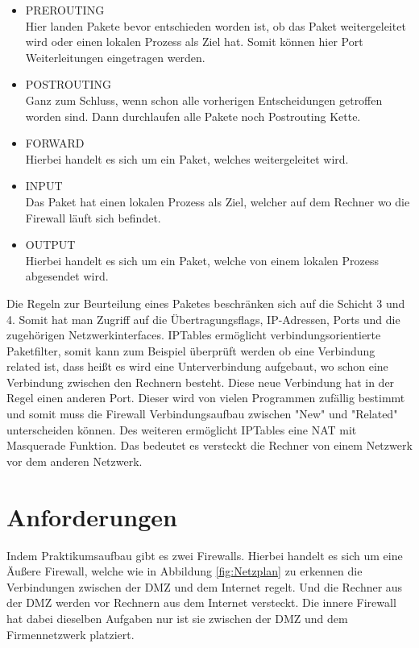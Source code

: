 \begin{itemize}
	\item PREROUTING \\
	Hier landen Pakete bevor entschieden worden ist, ob das Paket weitergeleitet wird oder einen lokalen Prozess als Ziel hat. Somit können hier Port Weiterleitungen eingetragen werden.
	\item POSTROUTING \\
	Ganz zum Schluss, wenn schon alle vorherigen Entscheidungen getroffen worden sind. Dann durchlaufen alle Pakete noch Postrouting Kette.
	\item FORWARD \\
	Hierbei handelt es sich um ein Paket, welches weitergeleitet wird.
	\item INPUT \\
	Das Paket hat einen lokalen Prozess als Ziel, welcher auf dem Rechner wo die Firewall läuft sich befindet.
	\item OUTPUT \\
	Hierbei handelt es sich um ein Paket, welche von einem lokalen Prozess abgesendet wird.
\end{itemize}
Die Regeln zur Beurteilung eines Paketes beschränken sich auf die Schicht 3 und 4. Somit hat man Zugriff auf die Übertragungsflags, IP-Adressen, Ports und die zugehörigen Netzwerkinterfaces. IPTables ermöglicht verbindungsorientierte Paketfilter, somit kann zum Beispiel überprüft werden ob eine Verbindung related ist, dass heißt es wird eine Unterverbindung aufgebaut, wo schon eine Verbindung zwischen den Rechnern besteht. Diese neue Verbindung hat in der Regel einen anderen Port. Dieser wird von vielen Programmen zufällig bestimmt und somit muss die Firewall Verbindungsaufbau zwischen "New" und "Related" unterscheiden können. Des weiteren ermöglicht IPTables eine NAT mit Masquerade Funktion. Das bedeutet es versteckt die Rechner von einem Netzwerk vor dem anderen Netzwerk.

\section{Anforderungen}
Indem Praktikumsaufbau gibt es zwei Firewalls. Hierbei handelt es sich um eine Äußere Firewall, welche wie in Abbildung \ref{fig:Netzplan} zu erkennen die Verbindungen zwischen der DMZ und dem Internet regelt. Und die Rechner aus der DMZ werden vor Rechnern aus dem Internet versteckt. Die innere Firewall hat dabei dieselben Aufgaben nur ist sie zwischen der DMZ und dem Firmennetzwerk platziert.

